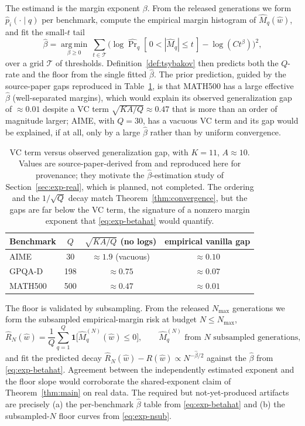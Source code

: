 \documentclass{article} %
\providecommand{\argmin}{\mathop{\mathrm{arg\,min}}\limits}
\providecommand{\Risk}{R}
\providecommand{\phat}{\widehat{p}}
\providecommand{\Mhat}{\widehat{M}}
\providecommand{\what}{\widehat{w}}
\begin{document}
The estimand is the margin exponent $\beta$. From the released generations we form
$\phat_i(\cdot\mid q)$ per benchmark, compute the empirical margin histogram of
$\Mhat_q(\what)$, and fit the small-$t$ tail
\begin{equation}
\label{eq:exp-betahat}
\hat\beta = \argmin_{\beta\ge 0}\ \sum_{t\in\mathcal T}
\Big(\log \widehat{\Pr}_q[\,0<|\Mhat_q|\le t\,] - \log(C t^{\beta})\Big)^2,
\end{equation}
over a grid $\mathcal T$ of thresholds. Definition~\ref{def:tsybakov} then predicts
both the $Q$-rate and the floor from the single fitted $\hat\beta$. The prior
prediction, guided by the source-paper gaps reproduced in
Table~\ref{tab:vcgap}, is that MATH500 has a large effective $\hat\beta$
(well-separated margins), which would explain its observed generalization gap of
$\approx 0.01$ despite a VC term $\sqrt{KA/Q}\approx 0.47$ that is more than an
order of magnitude larger; AIME, with $Q=30$, has a vacuous VC term and its gap
would be explained, if at all, only by a large $\hat\beta$ rather than by uniform
convergence.

\begin{table}[t]
\centering
\small
\begin{tabular}{lccc}
\toprule
Benchmark & $Q$ & $\sqrt{KA/Q}$ (no logs) & empirical vanilla gap \\
\midrule
AIME    & 30  & $\approx 1.9$ (vacuous) & $\approx 0.10$ \\
GPQA-D  & 198 & $\approx 0.75$          & $\approx 0.07$ \\
MATH500 & 500 & $\approx 0.47$          & $\approx 0.01$ \\
\bottomrule
\end{tabular}
\caption{VC term versus observed generalization gap, with $K=11$, $A\approx 10$.
Values are source-paper-derived from \citet{komiyama2026best} and reproduced here
for provenance; they motivate the $\hat\beta$-estimation study of
Section~\ref{sec:exp-real}, which is planned, not completed. The ordering and the
$1/\sqrt Q$ decay match Theorem~\ref{thm:convergence}, but the gaps are far below the VC
term, the signature of a nonzero margin exponent that \eqref{eq:exp-betahat} would
quantify.}
\label{tab:vcgap}
\end{table}

The floor is validated by subsampling. From the released $N_{\max}$ generations we
form the subsampled empirical-margin risk at budget $N\le N_{\max}$,
\begin{equation}
\label{eq:exp-nsub}
\widehat{\Risk}_N(\what)
= \frac1{Q}\sum_{q=1}^{Q}
\mathbf 1\!\big[\Mhat_q^{(N)}(\what)\le 0\big],
\qquad
\Mhat_q^{(N)} \text{ from } N \text{ subsampled generations},
\end{equation}
and fit the predicted decay $\widehat{\Risk}_N(\what)-\Risk(\what)\propto
N^{-\hat\beta/2}$ against the $\hat\beta$ from \eqref{eq:exp-betahat}. Agreement
between the independently estimated exponent and the floor slope would corroborate
the shared-exponent claim of Theorem~\ref{thm:main} on real data. The required but
not-yet-produced artifacts are precisely (a) the per-benchmark $\hat\beta$ table
from \eqref{eq:exp-betahat} and (b) the subsampled-$N$ floor curves from
\eqref{eq:exp-nsub}.
\end{document}
